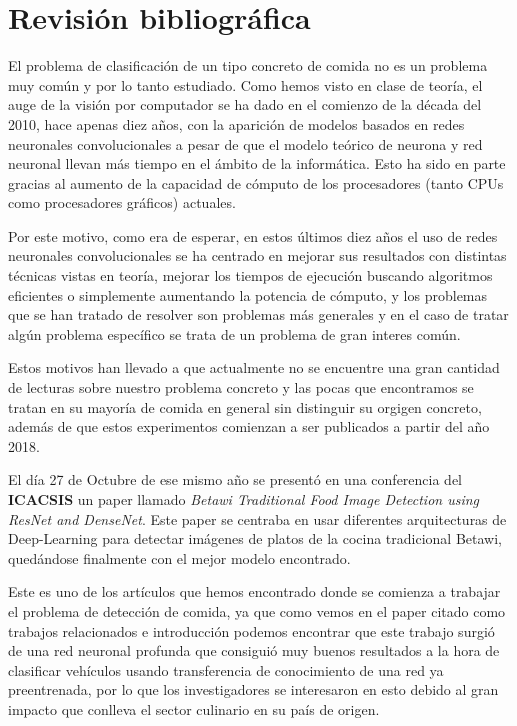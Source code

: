 \section{Revisión bibliográfica}

El problema de clasificación de un tipo concreto de comida no es un problema muy común y por lo tanto estudiado. Como hemos visto en clase de teoría, el auge de la visión por computador se ha dado en el comienzo de la década del 2010, hace apenas diez años, con la aparición de modelos basados en redes neuronales convolucionales a pesar de que el modelo teórico de neurona y red neuronal llevan más tiempo en el ámbito de la informática. Esto ha sido en parte gracias al aumento de la capacidad de cómputo de los procesadores (tanto CPUs como procesadores gráficos) actuales.

Por este motivo, como era de esperar, en estos últimos diez años el uso de redes neuronales convolucionales se ha centrado en mejorar sus resultados con distintas técnicas vistas en teoría, mejorar los tiempos de ejecución buscando algoritmos eficientes o simplemente aumentando la potencia de cómputo, y los problemas que se han tratado de resolver son problemas más generales y en el caso de tratar algún problema específico se trata de un problema de gran interes común.

Estos motivos han llevado a que actualmente no se encuentre una gran cantidad de lecturas sobre nuestro problema concreto y las pocas que encontramos se tratan en su mayoría de comida en general sin distinguir su orgigen concreto, además de que estos experimentos comienzan a ser publicados a partir del año 2018.

El día 27 de Octubre de ese mismo año se presentó en una conferencia del \textbf{ICACSIS} un paper llamado \textit{Betawi Traditional Food Image Detection using
ResNet and DenseNet}\cite{betawi}. Este paper se centraba en usar diferentes arquitecturas de Deep-Learning para detectar imágenes de platos de la cocina tradicional Betawi, quedándose finalmente con el mejor modelo encontrado.

Este es uno de los artículos que hemos encontrado donde se comienza a trabajar el problema de detección de comida, ya que como vemos en el paper citado como trabajos relacionados e introducción podemos encontrar que este trabajo surgió de una red neuronal profunda que consiguió muy buenos resultados a la hora de clasificar vehículos usando transferencia de conocimiento de una red ya preentrenada, por lo que los investigadores se interesaron en esto debido al gran impacto que conlleva el sector culinario en su país de origen.

